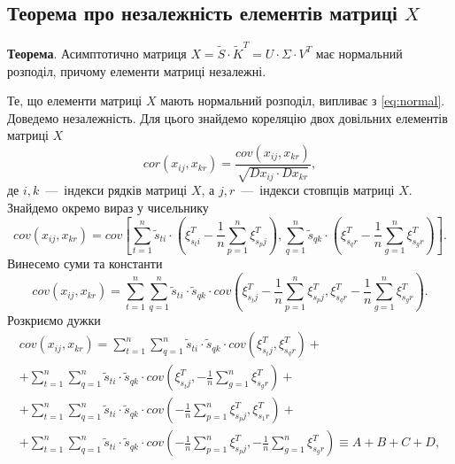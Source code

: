 \subsection{Теорема про незалежність елементів матриці $X$}

\textbf{Теорема}.
Асимптотично матриця $X = \tilde{S} \cdot \tilde{K}^T = U \cdot \Sigma \cdot V^T$
має нормальний розподіл, причому елементи матриці незалежні.

Те, що елементи матриці $X$ мають нормальний розподіл,
випливає з \eqref{eq:normal}.
Доведемо незалежність.
Для цього знайдемо кореляцію двох довільних елементів матриці $X$
\begin{equation}\label{eq:cor}
  cor \left( x_{ij}, x_{kr} \right) =
  \frac{cov \left( x_{ij}, x_{kr} \right) }{\sqrt{Dx_{ij} \cdot Dx_{kr}}},
\end{equation}
де $i, k$~---~індекси рядків матриці $X$,
а $j, r$~---~індекси стовпців матриці $X$.
Знайдемо окремо вираз у чисельнику
\begin{equation*}
  cov \left( x_{ij}, x_{kr} \right) =
  cov \left[
    \sum \limits_{t=1}^n \tilde{s}_{ti} \cdot \left(
      \xi_{s_t i}^T - \frac{1}{n} \sum \limits_{p=1}^n \xi_{s_p j}^T
    \right),
    \sum \limits_{q=1}^n \tilde{s}_{qk} \cdot \left(
      \xi_{s_q r}^T - \frac{1}{n} \sum \limits_{g=1}^n \xi_{s_g r}^T
    \right)
  \right].
\end{equation*}
Винесемо суми та константи
\begin{equation*}
  cov \left( x_{ij}, x_{kr} \right) =
  \sum \limits_{t=1}^n
    \sum \limits_{q=1}^n
      \tilde{s}_{ti} \cdot \tilde{s}_{qk} \cdot cov \left(
        \xi_{s_t j}^T - \frac{1}{n} \sum \limits_{p=1}^n \xi_{s_p j}^T,
        \xi_{s_q r}^T - \frac{1}{n} \sum \limits_{g=1}^n \xi_{s_g r}^T
      \right).
\end{equation*}
Розкриємо дужки
\begin{equation*}
  \begin{gathered}
    cov \left( x_{ij}, x_{kr} \right) =
    \sum \limits_{t=1}^n
      \sum \limits_{q=1}^n
        \tilde{s}_{ti} \cdot \tilde{s}_{qk} \cdot
        cov \left( \xi_{s_t j}^T, \xi_{s_q r}^T \right) + \\
    + \sum \limits_{t=1}^n
      \sum \limits_{q=1}^n
        \tilde{s}_{ti} \cdot \tilde{s}_{qk} \cdot cov \left(
          \xi_{s_t j}^T, -\frac{1}{n} \sum \limits_{g=1}^n \xi_{s_g r}^T
        \right) + \\
    + \sum \limits_{t=1}^n
      \sum \limits_{q=1}^n
        \tilde{s}_{ti} \cdot \tilde{s}_{qk} \cdot cov \left(
          -\frac{1}{n} \sum \limits_{p=1}^n \xi_{s_p j}^T, \xi_{s_1 r}^T
        \right) + \\
    + \sum \limits_{t=1}^n
      \sum \limits_{q=1}^n
        \tilde{s}_{ti} \cdot \tilde{s}_{qk} \cdot cov \left(
          -\frac{1}{n} \sum \limits_{p=1}^n \xi_{s_p j}^T,
          -\frac{1}{n} \sum \limits_{g=1}^n \xi_{s_g r}^T
        \right) \equiv
    A + B + C + D,
  \end{gathered}
\end{equation*}
